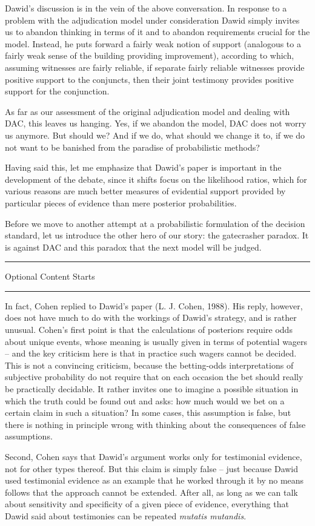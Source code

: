 \documentclass[
  10pt,
  dvipsnames,enabledeprecatedfontcommands]{scrartcl}
\newcommand{\intermezzoa}{
	\begin{minipage}[c]{13cm}
	\begin{center}\rule{10cm}{0.4pt}



	\tiny{\sc Optional Content Starts}
	
	\vspace{-1mm}
	
	\rule{10cm}{0.4pt}\end{center}
	\end{minipage}\nopagebreak 
	}
\begin{document}
Dawid's discussion is in the vein of the above conversation. In response
to a problem with the adjudication model under consideration Dawid
simply invites us to abandon thinking in terms of it and to abandon
requirements crucial for the model. Instead, he puts forward a fairly
weak notion of support (analogous to a fairly weak sense of the building
providing improvement), according to which, assuming witnesses are
fairly reliable, if separate fairly reliable witnesses provide positive
support to the conjuncts, then their joint testimony provides positive
support for the conjunction.

As far as our assessment of the original adjudication model and dealing
with DAC, this leaves us hanging. Yes, if we abandon the model, DAC does
not worry us anymore. But should we? And if we do, what should we change
it to, if we do not want to be banished from the paradise of
probabilistic methods?

Having said this, let me emphasize that Dawid's paper is important in
the development of the debate, since it shifts focus on the likelihood
ratios, which for various reasons are much better measures of evidential
support provided by particular pieces of evidence than mere posterior
probabilities.

Before we move to another attempt at a probabilistic formulation of the
decision standard, let us introduce the other hero of our story: the
gatecrasher paradox. It is against DAC and this paradox that the next
model will be judged.

\intermezzoa

In fact, Cohen replied to Dawid's paper (L. J. Cohen, 1988). His reply,
however, does not have much to do with the workings of Dawid's strategy,
and is rather unusual. Cohen's first point is that the calculations of
posteriors require odds about unique events, whose meaning is usually
given in terms of potential wagers -- and the key criticism here is that
in practice such wagers cannot be decided. This is not a convincing
criticism, because the betting-odds interpretations of subjective
probability do not require that on each occasion the bet should really
be practically decidable. It rather invites one to imagine a possible
situation in which the truth could be found out and asks: how much would
we bet on a certain claim in such a situation? In some cases, this
assumption is false, but there is nothing in principle wrong with
thinking about the consequences of false assumptions.

Second, Cohen says that Dawid's argument works only for testimonial
evidence, not for other types thereof. But this claim is simply false --
just because Dawid used testimonial evidence as an example that he
worked through it by no means follows that the approach cannot be
extended. After all, as long as we can talk about sensitivity and
specificity of a given piece of evidence, everything that Dawid said
about testimonies can be repeated \emph{mutatis mutandis}.
\end{document}

